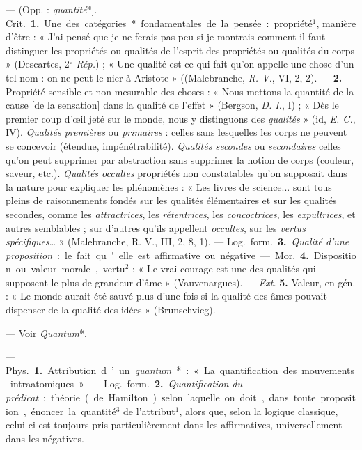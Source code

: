 
	\begin{itemize}[leftmargin=1cm, label=, itemsep=1pt]

 — (Opp. : {\it quantité}*]. \si{Crit.} {\bf 1.} Une des
catégories* fondamentales de la pensée : propriété$^1$, manière d’être : «
J’ai pensé que je ne ferais pas peu si je montrais comment il faut distinguer
les propriétés ou qualités de l'esprit des propriétés ou qualités du corps
» (Descartes, 2$^\text{e}$ {\it Rép.}) ; « Une qualité est ce qui fait qu'on
appelle une chose d’un tel nom : on ne peut le nier à
Aristote » ((Malebranche, {\it R. V.}, VI, 2, 2). — {\bf 2.} Propriété
sensible et non mesurable des choses : « Nous mettons la quantité de la cause
[de la sensation] dans la qualité de l'effet » (Bergson, {\it D. I.}, I) ; «
Dès le premier coup d'œil jeté sur le monde, nous y distinguons des {\it
qualités} » (id, {\it E. C.}, IV). {\it Qualités premières} ou {\it
primaires} : celles sans lesquelles les corps ne peuvent se concevoir
(étendue, impénétrabilité). {\it Qualités secondes} ou {\it secondaires}
celles qu'on peut supprimer par abstraction sans supprimer la notion de corps
(couleur, saveur, etc.). {\it Qualités occultes} propriétés non constatables
qu’on supposait dans la nature pour expliquer les phénomènes : « Les livres
de science... sont tous pleins de raisonnements fondés sur les qualités
élémentaires et sur les qualités secondes, comme les {\it attractrices}, les
{\it rétentrices}, les {\it concoctrices}, les {\it expultrices}, et autres
semblables ; sur d’autres qu'ils appellent {\it occultes}, sur les {\it
vertus spécifiques}… » (Malebranche, R. V., III, 2, 8, 1). — \si{Log.}
\si{form.} {\bf 3.} {\it Qualité d’une proposition} : le fait qu'elle est
affirmative ou négative.

— \si{Mor.} {\bf 4.} Disposition ou valeur morale, vertu$^2$ : « Le vrai
courage est une des qualités qui supposent le plus de grandeur d'âme
» (Vauvenargues). — {\it Ext.} {\bf 5.} Valeur, en gén. : « Le monde aurait
été sauvé plus d’une fois si la qualité des âmes pouvait dispenser de la
qualité des idées » (Brunschvicg).

 — Voir {\it Quantum}*.

 — \si{Phys.} {\bf 1.} Attribution d’un {\it quantum}* : «
La quantification des mouvements intraatomiques ». — \si{Log.} \si{form.}
{\bf 2.} {\it Quantification du prédicat} : théorie (de Hamilton) selon
laquelle on doit,
dans toute proposition, énoncer la quantité$^3$ de l’attribut$^1$, alors que,
selon la logique classique, celui-ci est toujours pris particulièrement dans
les affirmatives, universellement dans les négatives.


\end{itemize}
